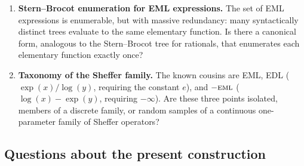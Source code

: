 \documentclass[11pt]{article}
\theoremstyle{plain}
\theoremstyle{definition}
\begin{document}
\begin{enumerate}[topsep=2pt, itemsep=4pt, label=\textbf{P\arabic*}]
\item \textbf{Stern--Brocot enumeration for EML expressions.}
  The set of EML expressions is enumerable, but with massive
  redundancy: many syntactically distinct trees evaluate to the same
  elementary function. Is there a canonical form, analogous to the
  Stern--Brocot tree for rationals, that enumerates each elementary
  function exactly once?

\item \textbf{Taxonomy of the Sheffer family.}
  The known cousins are EML, EDL ($\exp(x)/\log(y)$, requiring the
  constant $e$), and $-\textsc{eml}$ ($\log(x) - \exp(y)$, requiring
  $-\infty$). Are these three points isolated, members of a discrete
  family, or random samples of a continuous one-parameter family of
  Sheffer operators?
\end{enumerate}

\subsection*{Questions about the present construction}
\end{document}

